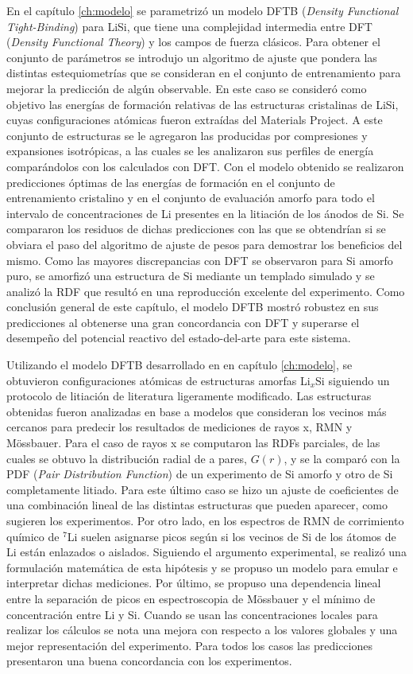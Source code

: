 En el capítulo \ref{ch:modelo} se parametrizó un modelo DFTB (\textit{Density 
Functional Tight-Binding}) para LiSi, que tiene una complejidad intermedia entre 
DFT (\textit{Density Functional Theory}) y los campos de fuerza clásicos. Para 
obtener el conjunto de parámetros se introdujo un algoritmo de ajuste que pondera
las distintas estequiometrías que se consideran en el conjunto de entrenamiento 
para mejorar la predicción de algún observable. En este caso se consideró como 
objetivo las energías de formación relativas de las estructuras cristalinas de 
LiSi, cuyas configuraciones atómicas fueron extraídas del Materials Project.
A este conjunto de estructuras se le agregaron las producidas por compresiones y 
expansiones isotrópicas, a las cuales se les analizaron sus perfiles de energía 
comparándolos con los calculados con DFT. Con el modelo obtenido se realizaron
predicciones óptimas de las energías de formación en el conjunto de entrenamiento 
cristalino y en el conjunto de evaluación amorfo para todo el intervalo de
concentraciones de Li presentes en la litiación de los ánodos de Si. Se compararon 
los residuos de dichas predicciones con las que se obtendrían si se obviara el 
paso del algoritmo de ajuste de pesos para demostrar los beneficios del mismo.
Como las mayores discrepancias con DFT se observaron para Si amorfo puro, se 
amorfizó una estructura de Si mediante un templado simulado y se analizó la RDF 
que resultó en una reproducción excelente del experimento. Como conclusión 
general de este capítulo, el modelo DFTB mostró robustez en sus predicciones al
obtenerse una gran concordancia con DFT y superarse el desempeño del potencial 
reactivo del estado-del-arte para este sistema.

Utilizando el modelo DFTB desarrollado en en capítulo \ref{ch:modelo}, se 
obtuvieron configuraciones atómicas de estructuras amorfas Li$_x$Si siguiendo un 
protocolo de litiación de literatura ligeramente modificado. Las estructuras 
obtenidas fueron analizadas en base a modelos que consideran los vecinos más 
cercanos para predecir los resultados de mediciones de rayos x, RMN y Mössbauer.
Para el caso de rayos x se computaron las RDFs parciales, de las cuales se obtuvo
la distribución radial de a pares, $G(r)$, y se la comparó con la PDF 
(\textit{Pair Distribution Function}) de un experimento de Si amorfo y otro de Si
completamente litiado. Para este último caso se hizo un ajuste de coeficientes de 
una combinación lineal de las distintas estructuras que pueden aparecer, como 
sugieren los experimentos. Por otro lado, en los espectros de RMN de corrimiento 
químico de $^7$Li suelen asignarse picos según si los vecinos de Si de los átomos de Li están
enlazados o aislados. Siguiendo el argumento experimental, se realizó una 
formulación matemática de esta hipótesis y se propuso un modelo para emular e 
interpretar dichas mediciones. Por último, se propuso una dependencia lineal 
entre la separación de picos en espectroscopia de Mössbauer y el mínimo de 
concentración entre Li y Si. Cuando se usan las concentraciones locales para 
realizar los cálculos se nota una mejora con respecto a los valores globales y
una mejor representación del experimento. Para todos los casos las predicciones
presentaron una buena concordancia con los experimentos.
